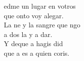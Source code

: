 \begin{cancion}%
	edme un lugar en votros\\
	que onto voy alegar.\\
	La ne y la sangre que ngo \\
	a dos la y a dar.\\
	Y deque a hagis did \\
	que a  es a quien coris. \\
\end{cancion}%
